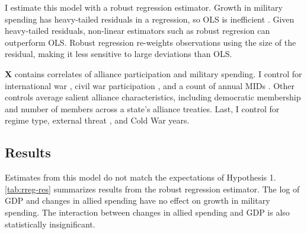 \documentclass[12pt]{article}
\begin{document}
I estimate this model with a robust regression estimator. 
Growth in military spending has heavy-tailed residuals in a regression, so OLS is inefficient \citep{RaineyBaissa2018}. 
Given heavy-tailed residuals, non-linear estimators such as robust regresion can outperform OLS. 
Robust regression re-weights observations using the size of the residual, making it less sensitive to large deviations than OLS. 


\textbf{X} contains correlates of alliance participation and military spending. 
I control for international war \citep{Reiteretal2016}, civil war participation \citep{SarkeesWayman2010}, and a count of annual MIDs \citep{Gibleretal2016}. 
Other controls average salient alliance characteristics, including democratic membership \citep{DigiuseppePoast2016} and number of members across a state's alliance treaties.   
Last, I control for regime type, external threat \citep{LeedsSavun2007}, and Cold War years. 


\subsection{Results}


Estimates from this model do not match the expectations of Hypothesis 1. 
\autoref{tab:rreg-res} summarizes results from the robust regression estimator. 
The log of GDP and changes in allied spending have no effect on growth in military spending. 
The interaction between changes in allied spending and GDP is also statistically insignificant. 
\end{document}
